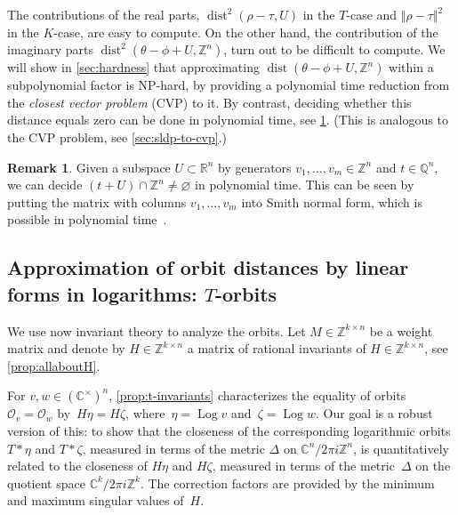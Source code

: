 \documentclass[10pt,a4paper]{article}
\theoremstyle{definition}
\newtheorem{remark}[theorem]{Remark}
\DeclareMathOperator{\Log}{Log}
\DeclareMathOperator{\dist}{dist}
\newcommand{\QQ}{\mathbb{Q}}
\newcommand{\CC}{\mathbb{C}}
\newcommand{\ZZ}{\mathbb{Z}}
\newcommand{\RR}{\mathbb{R}}
\newcommand{\OO}{\ensuremath{\mathcal{O}}}
\numberwithin{equation}{section}
\begin{document}
The contributions of the real parts,
$\dist^2(\rho-\tau,U)$ in the $T$-case and $\Vert\rho-\tau\Vert^2$ in the $K$-case,
are easy to compute.
On the other hand, the contribution of the imaginary parts
$\dist^2(\theta-\phi + U, \ZZ^n)$,
turn out to be difficult to compute.
We will show in \cref{sec:hardness} that approximating
$\dist(\theta-\phi +U,\ZZ^n)$ within a subpolynomial factor is \textsc{NP}-hard,
by providing a polynomial time reduction from the \textit{closest vector problem} (CVP) to it.
By contrast, deciding whether this distance equals zero can be done in polynomial time, see \cref{re:equ-lattice-dist}.
(This is analogous to the \textsc{CVP} problem, see \cref{sec:sldp-to-cvp}.)

\begin{remark}\label{re:equ-lattice-dist}
Given a subspace $U\subset\RR^n$
by generators $v_1,\ldots,v_m\in\ZZ^n$ and
$t\in\QQ^n$, we can decide
$(t + U) \cap \ZZ^n \neq \varnothing$
in polynomial time. This can be seen by
putting the matrix with columns $v_1,\ldots,v_m$
into Smith normal form, which is
possible in polynomial time~\cite{snf}.
\end{remark}

\subsection{Approximation of orbit distances by linear forms in logarithms: \texorpdfstring{$T$}{T}-orbits}
We use now invariant theory to analyze the orbits.
Let $M\in\ZZ^{k\times n}$ be a weight matrix and denote by
$H\in\ZZ^{k\times n}$ a matrix of rational invariants
of $H\in\ZZ^{k\times n}$, see \cref{prop:allaboutH}.

For $v,w\in(\CC^\times)^n$, \cref{prop:t-invariants} characterizes the equality of orbits~$\OO_v = \OO_w$ by~$H\eta = H\zeta$, where~$\eta =\Log v$ and~$\zeta = \Log w$.
Our goal is a robust version of this:
to show that the closeness of the corresponding logarithmic orbits
$T\ast \eta$ and $T\ast \zeta$,
measured in terms of the metric $\Delta$ on $\CC^n/2\pi i\ZZ^n$,
is quantitatively related to the closeness of
$H\eta$ and $H\zeta$, measured in terms of the metric~$\Delta$
on the quotient space $\CC^k/2\pi i \ZZ^k$.
The correction factors are provided by the minimum and maximum singular values of~$H$.
\end{document}
